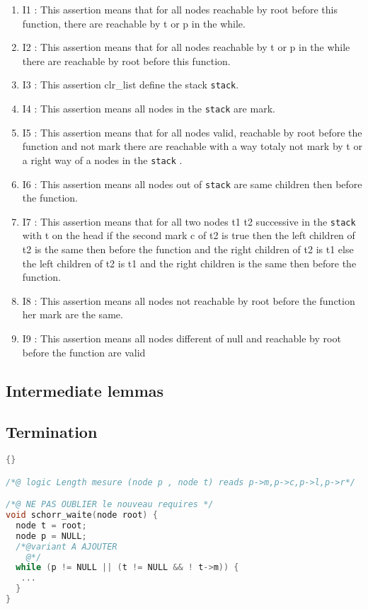 \begin {enumerate}
\item {I1} : This assertion means that for all nodes reachable by root
  before this function, there are reachable by t or p in the while.
\item {I2} : This assertion means that for all nodes reachable by t or
  p in the while there are reachable by root before this function.
\item {I3} : This assertion clr\_list define the stack \texttt{stack}.
\item {I4} : This assertion means all nodes in the
  \texttt{stack} are mark.
\item {I5} : This assertion means that for all nodes valid, reachable by root
  before the function and not mark there are reachable with a way
  totaly not mark by t or a right way of a nodes in the \texttt{stack} .
\item {I6} : This assertion means all nodes out of \texttt{stack} are
  same children then before the function. 
\item {I7} : This assertion means that for all two nodes t1 t2 successive in
  the \texttt{stack} with t on the head if the second mark c of t2 is
  true then the left children of t2 is the same then before the
  function and the right children of t2 is t1 else the left children
  of t2 is t1 and the right children  is the same then before the
  function.
\item {I8} : This assertion means all nodes not reachable by root before the
  function her mark are the same.
\item {I9} :  This assertion means all nodes different of null and
  reachable by root before the function are valid
\end{enumerate}
\subsection{Intermediate lemmas}

\subsection{Termination}

\begin{lstlisting}[language=C]{}

/*@ logic Length mesure (node p , node t) reads p->m,p->c,p->l,p->r*/

/*@ NE PAS OUBLIER le nouveau requires */
void schorr_waite(node root) {
  node t = root;
  node p = NULL;
  /*@variant A AJOUTER
    @*/
  while (p != NULL || (t != NULL && ! t->m)) {
   ...
  }
}
\end{lstlisting}


